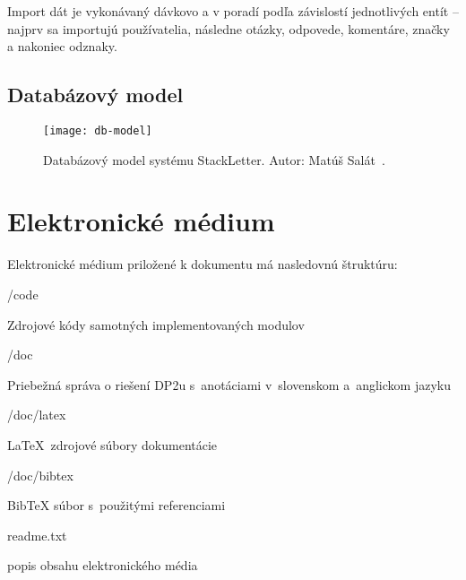 Import dát je vykonávaný dávkovo a v poradí podľa závislostí jednotlivých entít -- najprv sa importujú používatelia,
následne otázky, odpovede, komentáre, značky a nakoniec odznaky.


\section{Databázový model}\label{apx:dbmodel}
\begin{figure}[H]\begin{center}
\texttt{[image: db-model]}
\caption{Databázový model systému StackLetter. Autor: Matúš Salát~\cite{Salat2018}. \label{fig:db-model}}\end{center}
\end{figure}



\chapter{Elektronické médium}

Elektronické médium priložené k dokumentu má nasledovnú štruktúru:
\begin{my_itemize}
\emptyitem /code
	\begin{my_itemize}
	\myitem Zdrojové kódy samotných implementovaných modulov
	\end{my_itemize}
\emptyitem /doc
	\begin{my_itemize}
	\myitem Priebežná správa o riešení DP2u s~anotáciami v~slovenskom a~anglickom jazyku
	\end{my_itemize}
\emptyitem /doc/latex
	\begin{my_itemize}
	\myitem \LaTeX~zdrojové súbory dokumentácie
	\end{my_itemize}
\emptyitem /doc/bibtex
	\begin{my_itemize}
	\myitem BibTeX súbor s~použitými referenciami
	\end{my_itemize}
\emptyitem readme.txt
  \begin{my_itemize}
  \myitem popis obsahu elektronického média
  \end{my_itemize}
\end{my_itemize}
